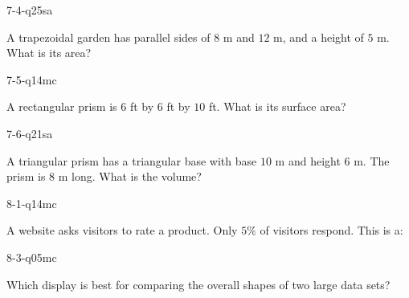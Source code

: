 \begin{practiceQuestion}{7-4-q25}{sa}
\begin{questionText}
A trapezoidal garden has parallel sides of $8$ m and $12$ m, and a height of $5$ m. What is its area?
\end{questionText}
\end{practiceQuestion}

\begin{practiceQuestion}{7-5-q14}{mc}
\begin{questionText}
A rectangular prism is $6$ ft by $6$ ft by $10$ ft. What is its surface area?
\end{questionText}
\end{practiceQuestion}

\begin{practiceQuestion}{7-6-q21}{sa}
\begin{questionText}
A triangular prism has a triangular base with base $10$ m and height $6$ m. The prism is $8$ m long. What is the volume?
\end{questionText}
\end{practiceQuestion}

\begin{practiceQuestion}{8-1-q14}{mc}
\begin{questionText}
A website asks visitors to rate a product. Only $5\%$ of visitors respond. This is a:
\end{questionText}
\end{practiceQuestion}

\begin{practiceQuestion}{8-3-q05}{mc}
\begin{questionText}
Which display is best for comparing the overall shapes of two large data sets?
\end{questionText}
\end{practiceQuestion}

